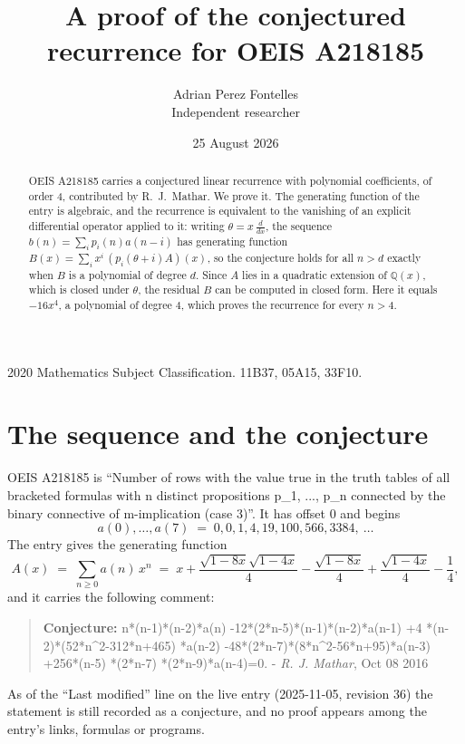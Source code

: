 \documentclass[11pt,a4paper]{article}
\title{A proof of the conjectured recurrence for OEIS A218185}
\author{Adrian Perez Fontelles\\ \small Independent researcher}
\date{25 August 2026}
\theoremstyle{plain}
\theoremstyle{definition}
\begin{document}
\maketitle

\begin{abstract}
OEIS A218185 carries a conjectured linear recurrence with polynomial coefficients, of
order 4, contributed by R.~J.~Mathar. We prove it. The generating function of the
entry is algebraic, and the recurrence is equivalent to the vanishing of an explicit
differential operator applied to it: writing $\theta=x\,\frac{d}{dx}$, the sequence
$b(n)=\sum_{i}p_{i}(n)a(n-i)$ has generating function
$B(x)=\sum_{i}x^{i}\,(p_{i}(\theta+i)A)(x)$, so the conjecture holds for all $n>d$ exactly
when $B$ is a polynomial of degree $d$. Since $A$ lies in a quadratic extension of
$\mathbb{Q}(x)$, which is closed under $\theta$, the residual $B$ can be computed in
closed form. Here it equals $- 16 x^{4}$, a polynomial of degree $4$, which proves
the recurrence for every $n>4$.
\end{abstract}

\noindent\small 2020 Mathematics Subject Classification. 11B37, 05A15, 33F10.\normalsize

\section{The sequence and the conjecture}

OEIS A218185 is ``Number of rows with the value true in the truth tables of all bracketed formulas with n distinct propositions p\_1, ..., p\_n connected by the binary connective of m-implication (case 3)''. It has offset $0$ and begins
\[
a(0),\dots,a(7)\;=\;0, 0, 1, 4, 19, 100, 566, 3384,\ \dots
\]
The entry gives the generating function
\begin{equation}\label{eq:gf}
A(x)\;=\;\sum_{n\ge 0} a(n)\,x^{n}\;=\;x + \frac{\sqrt{1 - 8 x} \sqrt{1 - 4 x}}{4} - \frac{\sqrt{1 - 8 x}}{4} + \frac{\sqrt{1 - 4 x}}{4} - \frac{1}{4} ,
\end{equation}
and it carries the following comment:
\begin{quote}\small
\textbf{Conjecture:} n*(n-1)*(n-2)*a(n) -12*(2*n-5)*(n-1)*(n-2)*a(n-1) +4 *(n-2)*(52*n\^{}2-312*n+465) *a(n-2) -48*(2*n-7)*(8*n\^{}2-56*n+95)*a(n-3) +256*(n-5) *(2*n-7) *(2*n-9)*a(n-4)=0. - \emph{R. J. Mathar}, Oct 08 2016
\end{quote}
As of the ``Last modified'' line on the live entry (2025-11-05, revision 36) the
statement is still recorded as a conjecture, and no proof appears among the entry's links,
formulas or programs.
\end{document}
